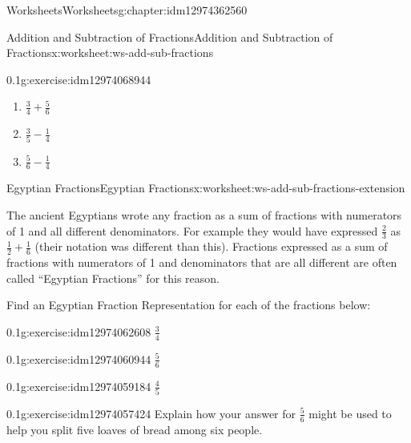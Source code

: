 \documentclass[twoside,11pt,]{book}
\begin{document}
\begin{chapterptx}{Worksheets}{}{Worksheets}{}{}{g:chapter:idm12974362560}
\begin{worksheet-section-numberless}{Addition and Subtraction of Fractions}{}{Addition and Subtraction of Fractions}{}{}{x:worksheet:ws-add-sub-fractions}
\begin{divisionexercise}{3}{}{0.1}{g:exercise:idm12974068944}
\begin{enumerate}[label=(\alph*)]
\item{}\(\frac{3}{4} + \frac{5}{6} \)%
\item{}\(\frac{3}{5} - \frac{1}{4} \)%
\item{}\(\frac{5}{6} - \frac{1}{4} \)%
\end{enumerate}
\end{divisionexercise}%
\end{worksheet-section-numberless}
\restoregeometry
%
%
\typeout{************************************************}
\typeout{************************************************}
%
\begin{worksheet-section-numberless}{Egyptian Fractions}{}{Egyptian Fractions}{}{}{x:worksheet:ws-add-sub-fractions-extension}
\begin{introduction}{}%
The ancient Egyptians wrote any fraction as a sum of fractions with numerators of 1 and all different denominators.  For example they would have expressed \(\frac{2}{3} \) as \(\frac{1}{2} + \frac{1}{6} \) (their notation was different than this).  Fractions expressed as a sum of fractions with numerators of 1 and denominators that are all different are often called “Egyptian Fractions” for this reason.%
\par
Find an Egyptian Fraction Representation for each of the fractions below:%
\end{introduction}%
\begin{divisionexercise}{1}{}{0.1}{g:exercise:idm12974062608}%
\(\frac{3}{4} \)%
\end{divisionexercise}%
\begin{divisionexercise}{2}{}{0.1}{g:exercise:idm12974060944}%
\(\frac{5}{6} \)%
\end{divisionexercise}%
\begin{divisionexercise}{3}{}{0.1}{g:exercise:idm12974059184}%
\(\frac{4}{5} \)%
\end{divisionexercise}%
\begin{divisionexercise}{4}{}{0.1}{g:exercise:idm12974057424}%
Explain how your answer for \(\frac{5}{6} \) might be used to help you split five loaves of bread among six people.%
\end{divisionexercise}%
\end{worksheet-section-numberless}
\restoregeometry
%
%
\typeout{************************************************}
\typeout{************************************************}

\end{chapterptx}
\end{document}
